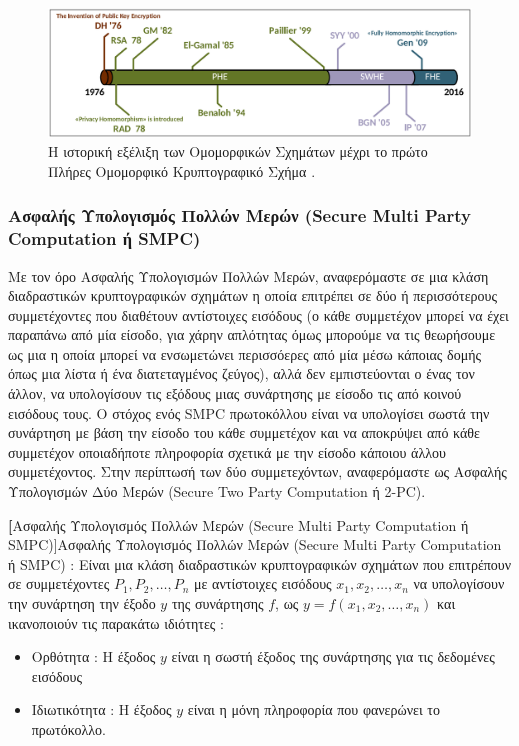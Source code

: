 \begin{figure}
    \centering
    \includegraphics[width=0.8\columnwidth]{./01_body/images/he_timeline.png}
    \caption{Η ιστορική εξέλιξη των Ομομορφικών Σχημάτων μέχρι το πρώτο Πλήρες Ομομορφικό Κρυπτογραφικό Σχήμα \cite{acar2018survey}.}
    \label{fig:he_timeline}
\end{figure}

\subsubsection[Ασφαλής Υπολογισμός Πολλών Μερών (Secure Multi Party Computation ή SMPC)]{Ασφαλής Υπολογισμός Πολλών Μερών (Secure Multi Party \\ Computation ή SMPC)}
Με τον όρο Ασφαλής Υπολογισμών Πολλών Μερών, αναφερόμαστε σε μια κλάση διαδραστικών κρυπτογραφικών σχημάτων η οποία επιτρέπει σε δύο ή περισσότερους συμμετέχοντες που διαθέτουν αντίστοιχες εισόδους (ο κάθε συμμετέχον μπορεί να έχει παραπάνω από μία είσοδο, για χάρην απλότητας όμως μπορούμε να τις θεωρήσουμε ως μια η οποία μπορεί να ενσωμετώνει περισσόερες από μία μέσω κάποιας δομής όπως μια λίστα ή ένα διατεταγμένος ζεύγος), αλλά δεν εμπιστεύονται ο ένας τον άλλον, να υπολογίσουν τις εξόδους μιας συνάρτησης με είσοδο τις από κοινού εισόδους τους. Ο στόχος ενός SMPC πρωτοκόλλου είναι να υπολογίσει σωστά την συνάρτηση με βάση την είσοδο του κάθε συμμετέχον και να αποκρύψει από κάθε συμμετέχον οποιαδήποτε πληροφορία σχετικά με την είσοδο κάποιου άλλου συμμετέχοντος. Στην περίπτωσή των δύο συμμετεχόντων, αναφερόμαστε ως Ασφαλής Υπολογισμών Δύο Μερών (Secure Two Party Computation ή 2-PC).

\begin{definition}
\textbf[Ασφαλής Υπολογισμός Πολλών Μερών (Secure Multi Party Computation ή SMPC)]{Ασφαλής Υπολογισμός Πολλών Μερών (Secure Multi Party Computation ή SMPC)} : Είναι μια κλάση διαδραστικών κρυπτογραφικών σχημάτων που επιτρέπουν σε συμμετέχοντες $P_1, P_2, \dots, P_n$ με αντίστοιχες εισόδους $x_1, x_2, \dots, x_n$ να υπολογίσουν την συνάρτηση την έξοδο $y$ της συνάρτησης $f$, ως $y = f(x_1, x_2, \dots, x_n)$ και ικανοποιούν τις παρακάτω ιδιότητες :

\begin{itemize}
    \item Ορθότητα : Η έξοδος $y$ είναι η σωστή έξοδος της συνάρτησης για τις δεδομένες εισόδους
    \item Ιδιωτικότητα : Η έξοδος $y$ είναι η μόνη πληροφορία που φανερώνει το πρωτόκολλο.
\end{itemize}
\end{definition}

